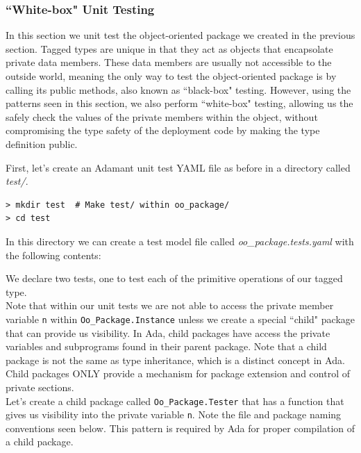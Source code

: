 \subsubsection{``White-box" Unit Testing}

In this section we unit test the object-oriented package we created in the previous section. Tagged types are unique in that they act as objects that encapsolate private data members. These data members are usually not accessible to the outside world, meaning the only way to test the object-oriented package is by calling its public methods, also known as ``black-box" testing. However, using the patterns seen in this section, we also perform ``white-box" testing, allowing us the safely check the values of the private members within the object, without compromising the type safety of the deployment code by making the type definition public.

First, let's create an Adamant unit test YAML file as before in a directory called \textit{test/}.

\vspace{5mm} %
\begin{verbatim}
> mkdir test  # Make test/ within oo_package/
> cd test 
\end{verbatim}
\vspace{5mm} %

In this directory we can create a test model file called \textit{oo\_package.tests.yaml} with the following contents:


We declare two tests, one to test each of the primitive operations of our tagged type. \\

Note that within our unit tests we are not able to access the private member variable \texttt{n} within \texttt{Oo\_Package.Instance} unless we create a special ``child" package that can provide us visibility. In Ada, child packages have access the private variables and subprograms found in their parent package. Note that a child package is not the same as type inheritance, which is a distinct concept in Ada. Child packages ONLY provide a mechanism for package extension and control of private sections. \\

Let's create a child package called \texttt{Oo\_Package.Tester} that has a function that gives us visibility into the private variable \texttt{n}. Note the file and package naming conventions seen below. This pattern is required by Ada for proper compilation of a child package. \\

